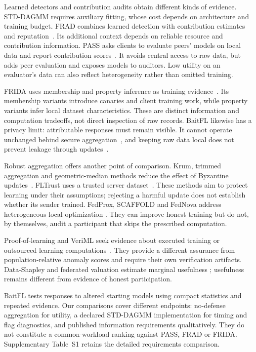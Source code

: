 \documentclass[journal]{IEEEtran}
\begin{document}
Learned detectors and contribution audits obtain different kinds of
evidence. STD-DAGMM requires auxiliary fitting, whose cost depends on
architecture and training budget. FRAD combines learned detection with
contribution estimates and reputation~\cite{wang2024frad}. Its additional
context depends on reliable resource and contribution information.
PASS asks clients to evaluate peers' models on local data and report
contribution scores~\cite{wang2024pass}. It avoids central access to raw
data, but adds peer evaluation and exposes models to auditors. Low
utility on an evaluator's data can also reflect heterogeneity rather
than omitted training.

FRIDA uses membership and property inference as training
evidence~\cite{recasens2026frida}. Its membership variants introduce
canaries and client training work, while property variants infer local
dataset characteristics. These are distinct information and computation
tradeoffs, not direct inspection of raw records. BaitFL likewise has a
privacy limit: attributable responses must remain visible. It cannot
operate unchanged behind secure aggregation~\cite{bonawitz2017practical},
and keeping raw data local does not prevent leakage through
updates~\cite{zhu2019leakage,melis2019leakage}.

Robust aggregation offers another point of comparison. Krum, trimmed
aggregation and geometric-median methods reduce the effect of Byzantine
updates~\cite{blanchard2017krum,yin2018byzantine,pillutla2022rfa}.
FLTrust uses a trusted server dataset~\cite{cao2021fltrust}. These methods
aim to protect learning under their assumptions; rejecting a harmful
update does not establish whether its sender trained. FedProx, SCAFFOLD
and FedNova address heterogeneous local optimization
\cite{li2020fedprox,karimireddy2020scaffold,wang2020fednova}. They can
improve honest training but do not, by themselves, audit a participant
that skips the prescribed computation.

Proof-of-learning and VeriML seek evidence about executed training or
outsourced learning computations~\cite{jia2021prooflearning,zhao2021veriml}.
They provide a different assurance from population-relative anomaly
scores and require their own verification artifacts. Data-Shapley and
federated valuation estimate marginal usefulness
\cite{ghorbani2019datashapley,jia2019datavaluation,liu2022gtgshapley};
usefulness remains different from evidence of honest participation.

BaitFL tests responses to altered starting models using compact
statistics and repeated evidence. Our comparisons cover different
endpoints: no-defense aggregation for utility, a declared STD-DAGMM
implementation for timing and flag diagnostics, and published information
requirements qualitatively. They do not constitute a common-workload
ranking against PASS, FRAD or FRIDA. Supplementary Table~S1 retains the
detailed requirements comparison.
\end{document}
